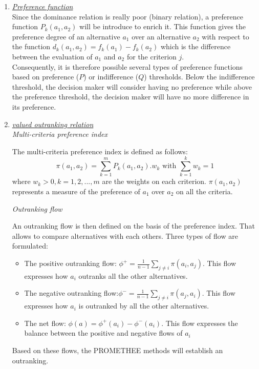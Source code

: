 \begin{enumerate}
\item \textit{\underline{Preference function}}\\
Since the dominance relation is really poor (binary relation), a preference function $P_k(a_1,a_2)$ will be introduce to enrich it. This function gives the preference degree of an alternative $a_1$ over an alternative $a_2$ with respect to the function $d_k(a_1,a_2) = f_k(a_1) - f_k(a_2)$ which is the difference between the evaluation of $a_1$ and $a_2$ for the criterion $j$.\\
Consequently, it is therefore possible several types of preference functions based on preference ($P$) or indifference ($Q$) thresholds. Below the indifference threshold, the decision maker will consider having no preference while above the preference threshold, the decision maker will have no more difference in its preference.

\item \textit{\underline{valued outranking relation}}\\
\textit{Multi-criteria preference index}

The multi-criteria preference index is defined as follows:
\begin{equation}
\pi (a_1, a_2) = \sum_{k=1}^{m} P_{k}(a_1, a_2).w_{k} \text{ with $\sum_{k=1}^{k} w_{k} = 1$}
\end{equation}
where $w_{k}>0, k=1, 2, ..., m$ are the weights on each criterion. $\pi (a_1, a_2)$ represents a measure of the preference of $a_1$ over $a_2$ on all the criteria.

\textit{Outranking flow}

An \og outranking flow \fg is then defined on the basis of the preference index. That allows to compare alternatives with each others. Three types of flow are formulated:
\begin{itemize}
\item The positive outranking flow: $\phi^ {+} = \frac{1}{n-1} \sum_{j \neq i} \pi (a_i, a_j)$. This flow expresses how $a_i$ outranks all the other alternatives.
\item The negative outranking flow:$\phi^ {-} = \frac{1}{n-1} \sum_{j \neq i} \pi (a_j, a_i)$. This flow expresses how $a_i$ is outranked by all the other alternatives.
\item The net flow: $\phi(a) = \phi^{+}(a_i) - \phi^{-}(a_i)$. This flow expresses the balance between the positive and negative flows of $a_i$
\end{itemize}
Based on these flows, the PROMETHEE methods will establish an outranking.


\end{enumerate}
